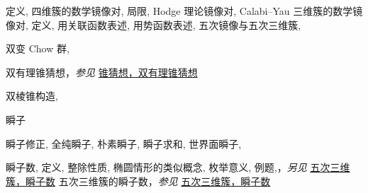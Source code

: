 \begin{theindex}
\subsubitem \leavevmode\hypertarget{idx:0751}{定义},\enspace{}
\subsubitem \leavevmode\hypertarget{idx:0752}{四维簇的数学镜像对},\enspace{}
\subsubitem \leavevmode\hypertarget{idx:0753}{局限},\enspace{}
\subitem \leavevmode\hypertarget{idx:0754}{Hodge 理论镜像对},\enspace{}
\subitem \leavevmode\hypertarget{idx:0755}{Calabi--Yau 三维簇的数学镜像对},\enspace{}
\subsubitem \leavevmode\hypertarget{idx:0756}{定义},\enspace{}
\subsubitem \leavevmode\hypertarget{idx:0757}{用关联函数表述},\enspace{}
\subsubitem \leavevmode\hypertarget{idx:0758}{用势函数表述},\enspace{}
\subitem \leavevmode\hypertarget{idx:0759}{五次镜像与五次三维簇},\enspace{}
\indexspace
\item \leavevmode\hypertarget{idx:0077}{双变 Chow 群},\enspace{}
\indexspace
\item \leavevmode\hypertarget{idx:0076}{双有理锥猜想}，\textit{参见} \hyperlink{idx:0158}{锥猜想，双有理锥猜想}
\indexspace
\item \leavevmode\hypertarget{idx:0075}{双棱锥构造},\enspace{}
\indexspace
\item \leavevmode\hypertarget{idx:0622}{瞬子}
\subitem \leavevmode\hypertarget{idx:0623}{瞬子修正},\enspace{}
\subitem \leavevmode\hypertarget{idx:0624}{全纯瞬子},\enspace{}
\subitem \leavevmode\hypertarget{idx:0625}{朴素瞬子},\enspace{}
\subitem \leavevmode\hypertarget{idx:0626}{瞬子求和},\enspace{}
\subitem \leavevmode\hypertarget{idx:0627}{世界面瞬子},\enspace{}
\indexspace
\item \leavevmode\hypertarget{idx:0628}{瞬子数},\enspace{}
\subitem \leavevmode\hypertarget{idx:0629}{定义},\enspace{}
\subitem \leavevmode\hypertarget{idx:0630}{整除性质},\enspace{}
\subitem \leavevmode\hypertarget{idx:0631}{椭圆情形的类似概念},\enspace{}
\subitem \leavevmode\hypertarget{idx:0632}{枚举意义},\enspace{}
\subitem \leavevmode\hypertarget{idx:0633}{例题},\enspace{}，\textit{另见} \hyperlink{idx:1191}{五次三维簇，瞬子数}
\subitem \leavevmode\hypertarget{idx:0634}{五次三维簇的瞬子数}，\textit{参见} \hyperlink{idx:1191}{五次三维簇，瞬子数}

\end{theindex}
